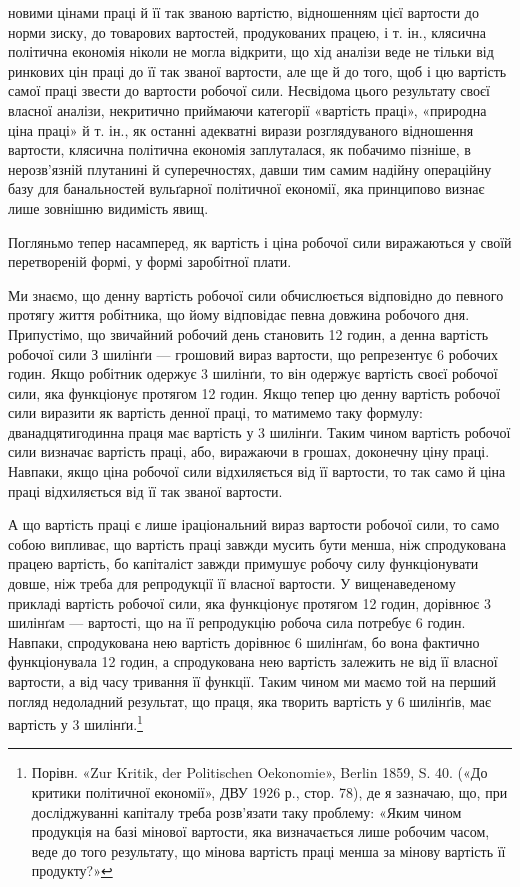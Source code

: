 \parcont{}  %
новими цінами праці й її так званою вартістю, відношенням цієї
вартости до норми зиску, до товарових вартостей, продукованих
працею, і т. ін., клясична політична економія ніколи не могла
відкрити, що хід аналізи веде не тільки від ринкових цін праці
до її так званої вартости, але ще й до того, щоб і цю вартість
самої праці звести до вартости робочої сили. Несвідома цього
результату своєї власної аналізи, некритично приймаючи категорії
«вартість праці», «природна ціна праці» й т. ін., як останні
адекватні вирази розглядуваного відношення вартости, клясична
політична економія заплуталася, як побачимо пізніше, в нерозв’язній
плутанині й суперечностях, давши тим самим надійну
операційну базу для банальностей вульґарної політичної економії,
яка принципово визнає лише зовнішню видимість явищ.

Погляньмо тепер насамперед, як вартість і ціна робочої сили
виражаються у своїй перетвореній формі, у формі заробітної
плати.

Ми знаємо, що денну вартість робочої сили обчислюється
відповідно до певного протягу життя робітника, що йому відповідає
певна довжина робочого дня. Припустімо, що звичайний
робочий день становить 12 годин, а денна вартість робочої сили
З шилінґи — грошовий вираз вартости, що репрезентує 6 робочих
годин. Якщо робітник одержує 3 шилінґи, то він одержує вартість
своєї робочої сили, яка функціонує протягом 12 годин.
Якщо тепер цю денну вартість робочої сили виразити як вартість
денної праці, то матимемо таку формулу: дванадцятигодинна
праця має вартість у 3 шилінґи. Таким чином вартість
робочої сили визначає вартість праці, або, виражаючи в грошах,
доконечну ціну праці. Навпаки, якщо ціна робочої сили
відхиляється від її вартости, то так само й ціна праці відхиляється
від її так званої вартости.

А що вартість праці є лише іраціональний вираз вартости
робочої сили, то само собою випливає, що вартість праці завжди
мусить бути менша, ніж спродукована працею вартість, бо капіталіст
завжди примушує робочу силу функціонувати довше,
ніж треба для репродукції її власної вартости. У вищенаведеному
прикладі вартість робочої сили, яка функціонує протягом
12 годин, дорівнює 3 шилінґам — вартості, що на її репродукцію
робоча сила потребує 6 годин. Навпаки, спродукована
нею вартість дорівнює 6 шилінґам, бо вона фактично функціонувала
12 годин, а спродукована нею вартість залежить не від її
власної вартости, а від часу тривання її функції. Таким чином
ми маємо той на перший погляд недоладний результат, що праця,
яка творить вартість у 6 шилінґів, має вартість у 3 шилінґи.\footnote{
Порівн. «Zur Kritik, der Politischen Oekonomie», Berlin 1859,
S. 40. («До критики політичної економії», ДВУ 1926 р., стор. 78), де я
зазначаю, що, при досліджуванні капіталу треба розв’язати таку проблему:
«Яким чином продукція на базі мінової вартости, яка визначається
лише робочим часом, веде до того результату, що мінова вартість
праці менша за мінову вартість її продукту?»
}
